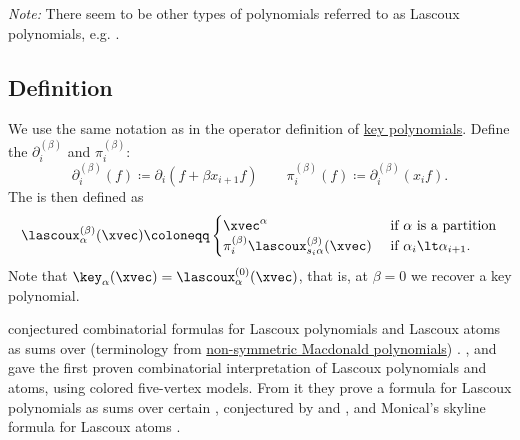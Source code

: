 \emph{Note:} There seem to be other types of polynomials referred to as
Lascoux polynomials,
e.g. \cite{BorziChenMotwaniVenturelloVodicka2021}.


\subsection[lascouxDefinition]{Definition}

We use the same notation as in the operator definition of \hyperref[key]{key polynomials}.
Define the 
\label{betaDividedDifferenceOperator} $\partial_i^{(\beta)}$ and
\(\pi_i^{(\beta)}\):
\[
\partial_i^{(\beta)}(f) \coloneqq 
\partial_i(f + \beta x_{i+1} f)
\qquad 
\pi_i^{(\beta)}(f) \coloneqq \partial_i^{(\beta)}(x_i f).
\]
The  is then defined as
\[
\lascoux^{(\beta)}_{\alpha}(\xvec) \coloneqq 
\begin{cases}
\xvec^{\alpha} & \text{ if $\alpha$ is a partition} \\
\pi_i^{(\beta)} 
\lascoux^{(\beta)}_{s_i \alpha}(\xvec)
& \text{ if $\alpha_i \lt \alpha_{i+1}$}.
\end{cases}
\]
Note that $\key_{\alpha}(\xvec) = \lascoux^{(0)}_{\alpha}(\xvec)$,
that is, at $\beta=0$ we recover a key polynomial.

 conjectured combinatorial formulas for Lascoux polynomials
and Lascoux atoms as sums over
\label{setValuedSkylineFilling}
(terminology from \hyperref[macdonaldE]{non-symmetric Macdonald polynomials})
\cite{Monical2017}.
,  and 
gave the first proven combinatorial interpretation of Lascoux polynomials and
atoms, using colored five-vertex models.  From it they prove a formula for
Lascoux polynomials as sums over certain
\label{lascouxSetValuedTableau}, conjectured by
 and 
\cite[Thm.~4.1]{BuciumasScrimshawWeber2020}, and Monical's skyline formula
for Lascoux atoms \cite[Thm.~4.4]{BuciumasScrimshawWeber2020}.

